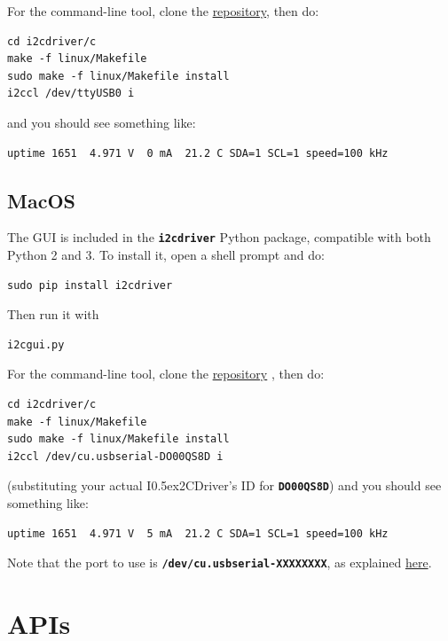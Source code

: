 \documentclass{article}
\newcommand{\two}{\raise0.5ex\hbox{\footnotesize{2}}}
\newcommand{\iicdriver}{I\two{}CDriver}
\newcommand{\mach}[1]{\texttt{\textbf{#1}}}
\begin{document}
For the command-line tool, clone the
\href{https://github.com/jamesbowman/i2cdriver}{repository},
then do:

\begin{lstlisting}
cd i2cdriver/c
make -f linux/Makefile
sudo make -f linux/Makefile install
i2ccl /dev/ttyUSB0 i
\end{lstlisting}

and you should see something like:

\begin{lstlisting}
uptime 1651  4.971 V  0 mA  21.2 C SDA=1 SCL=1 speed=100 kHz
\end{lstlisting}

\subsection{MacOS}

The GUI is included in the \mach{i2cdriver} Python package, compatible with both Python 2 and 3.
To install it, open a shell prompt and do:

\begin{lstlisting}
sudo pip install i2cdriver
\end{lstlisting}

Then run it with

\begin{lstlisting}
i2cgui.py
\end{lstlisting}

For the command-line tool, clone the
\href{https://github.com/jamesbowman/i2cdriver}{repository}
, then do:

\begin{lstlisting}
cd i2cdriver/c
make -f linux/Makefile
sudo make -f linux/Makefile install
i2ccl /dev/cu.usbserial-DO00QS8D i
\end{lstlisting}

(substituting your actual \iicdriver{}'s ID for \mach{DO00QS8D})
and you should see something like:

\begin{lstlisting}
uptime 1651  4.971 V  5 mA  21.2 C SDA=1 SCL=1 speed=100 kHz
\end{lstlisting}

Note that the port to use is \mach{/dev/cu.usbserial-XXXXXXXX}, as explained
\href{https://pbxbook.com/other/mac-tty.html}{here}.

\newpage
\section{APIs}
\end{document}
